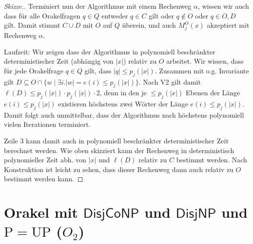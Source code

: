 \documentclass[nofonts]{uebung}
\theoremstyle{definition}
\def\P{\ensuremath{\mathrm{P}}}
\def\UP{\ensuremath{\mathrm{UP}}}
\def\hDisjNP{\ensuremath{\mathsf{DisjNP}}}
\def\hDisjCoNP{\ensuremath{\mathsf{DisjCoNP}}}
\begin{document}
\begin{proof}[Skizze.]
    Terminiert nun der Algorithmus mit einem Rechenweg $\alpha$, wissen wir auch dass für alle Orakelfragen $q\in Q$ entweder $q\in C$ gilt oder $q\not\in O$ oder $q\in O, D$ gilt.
    Damit stimmt $C\cup D$ mit $O$ auf $Q$ überein, und auch $M_j^O(x)$ akzeptiert mit Rechenweg $\alpha$.

    Laufzeit: Wir zeigen dass der Algorithmus in polynomiell beschränkter deterministischer Zeit (abhängig von $|x|$) relativ zu $O$ arbeitet. 
    Wir wissen, dass für jede Orakelfrage $q\in Q$ gilt, dass $|q|\leq p_j(|x|)$.
    Zusammen mit o.g. Invariante gilt $D\subseteq O\cap \{w \mid \exists i.|w|=e(i)\leq p_j(|x|)\}$.
    Nach V2 gilt damit $\ell(D)\leq p_j(|x|)\cdot p_j(|x|)\cdot 2$, denn in den je $\leq p_j(|x|)$ Ebenen der Länge $e(i)\leq p_j(|x|)$ existieren höchstens zwei Wörter der Länge $e(i)\leq p_j(|x|)$.
    Damit folgt auch unmittelbar, dass der Algorithmus nach höchstens polynomiell vielen Iterationen terminiert.

    Zeile 3 kann damit auch in polynomiell beschränkter deterministischer Zeit berechnet werden. Wie oben skizziert kann der Rechenweg in deterministisch polynomieller Zeit abh. von $|x|$ und $\ell(D)$ relativ zu $C$ bestimmt werden.
    Nach Konstruktion ist leicht zu sehen, dass dieser Rechenweg dann auch relativ zu $O$ bestimmt werden kann.
\end{proof}

\clearpage

\section{Orakel mit $\hDisjCoNP$ und $\hDisjNP$ und $\P=\UP$ ($O_2$)}
\end{document}
